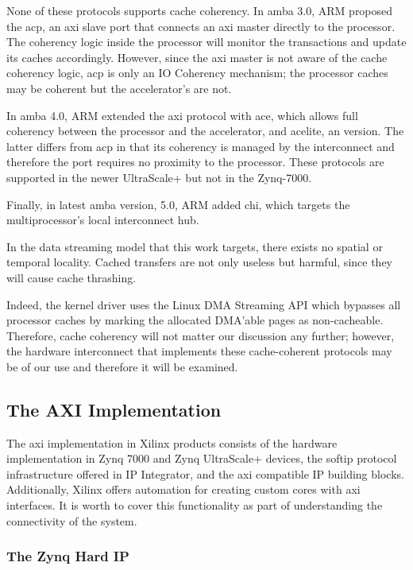 None of these protocols supports cache coherency. 
In \gls{amba} 3.0, ARM proposed the \gls{acp}, 
an \gls{axi} slave port that connects an \gls{axi} master directly to the processor.
The coherency logic inside the processor 
will monitor the transactions and update its caches accordingly.
However, since the \gls{axi} master is not aware of the cache coherency logic, 
\gls{acp} is only an \gls{IO Coherency} mechanism;
the processor caches may be coherent but the accelerator's are not.

In \gls{amba} 4.0, ARM extended the \gls{axi} protocol with \gls{ace}, 
which allows full coherency between the processor and the accelerator, 
and \gls{acelite}, an  version.
The latter differs from \gls{acp} in that its coherency is managed
by the interconnect and therefore the port requires no proximity
to the processor. 
These protocols are supported in the newer UltraScale+ but not in the Zynq-7000.

Finally, in latest \gls{amba} version, 5.0, ARM added \gls{chi}, 
which targets the multiprocessor's local interconnect hub.

In the data streaming model that this work targets, 
there exists no spatial or temporal locality. 
Cached transfers are not only useless but harmful, 
since they will cause cache thrashing. 

Indeed, the kernel driver uses the Linux DMA Streaming API
which bypasses all processor caches by marking 
the allocated DMA'able pages as non-cacheable.
Therefore, cache coherency will not matter our discussion any further;
however, the hardware interconnect that implements these cache-coherent
protocols may be of our use and therefore it will be examined.

\subsection{The AXI Implementation}

The \gls{axi} implementation in Xilinx products consists of the hardware 
implementation in Zynq 7000 and Zynq UltraScale+ devices,
the \gls{softip} protocol infrastructure offered in IP Integrator, 
and the \gls{axi} compatible IP building blocks. 
Additionally, Xilinx offers automation for creating 
custom cores with \gls{axi} interfaces.
It is worth to cover this functionality as 
part of understanding the connectivity of the system.

\subsubsection{The Zynq Hard IP}


